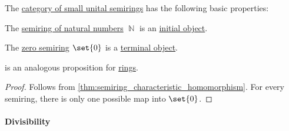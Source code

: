 \begin{proposition}\label{thm:category_of_semirings_properties}
  The \hyperref[def:semiring/category]{category of small unital semirings} has the following basic properties:
  \begin{thmenum}
     The \hyperref[def:natural_numbers]{semiring of natural numbers} \( \BbbN \) is an \hyperref[def:universal_objects/initial]{initial object}.

     The \hyperref[def:semiring/trivial]{zero semiring} \( \set{ 0 } \) is a \hyperref[def:universal_objects/terminal]{terminal object}.
  \end{thmenum}
\end{proposition}
\begin{comments}
  \item {} is an analogous proposition for \hyperref[def:ring]{rings}.
\end{comments}
\begin{proof}
   Follows from \cref{thm:semiring_characteristic_homomorphism}.
   For every semiring, there is only one possible map into \( \set{ 0 } \).
\end{proof}

\paragraph{Divisibility}

